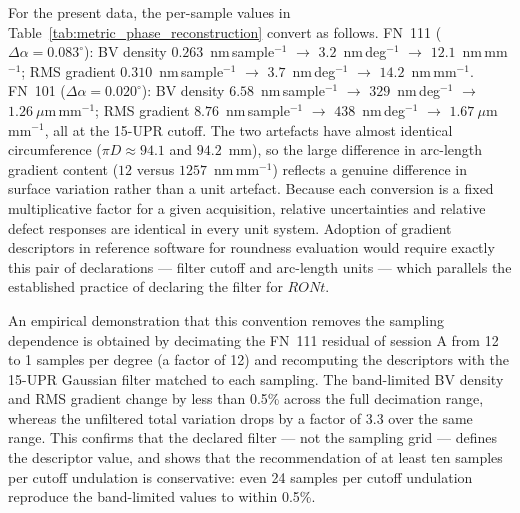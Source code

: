 \documentclass[review]{elsarticle}
\begin{document}
For the present data, the per-sample values in Table~\ref{tab:metric_phase_reconstruction} convert as follows. FN~111 ($\Delta\alpha=0.083^\circ$): BV density $0.263$~nm\,sample$^{-1}$ $\rightarrow$ $3.2$~nm\,deg$^{-1}$ $\rightarrow$ $12.1$~nm\,mm$^{-1}$; RMS gradient $0.310$~nm\,sample$^{-1}$ $\rightarrow$ $3.7$~nm\,deg$^{-1}$ $\rightarrow$ $14.2$~nm\,mm$^{-1}$. FN~101 ($\Delta\alpha=0.020^\circ$): BV density $6.58$~nm\,sample$^{-1}$ $\rightarrow$ $329$~nm\,deg$^{-1}$ $\rightarrow$ $1.26~\mu$m\,mm$^{-1}$; RMS gradient $8.76$~nm\,sample$^{-1}$ $\rightarrow$ $438$~nm\,deg$^{-1}$ $\rightarrow$ $1.67~\mu$m\,mm$^{-1}$, all at the 15-UPR cutoff. The two artefacts have almost identical circumference ($\pi D \approx 94.1$ and $94.2$~mm), so the large difference in arc-length gradient content ($12$ versus $1257$~nm\,mm$^{-1}$) reflects a genuine difference in surface variation rather than a unit artefact. Because each conversion is a fixed multiplicative factor for a given acquisition, relative uncertainties and relative defect responses are identical in every unit system. Adoption of gradient descriptors in reference software for roundness evaluation would require exactly this pair of declarations --- filter cutoff and arc-length units --- which parallels the established practice of declaring the filter for $RONt$.

An empirical demonstration that this convention removes the sampling dependence is obtained by decimating the FN~111 residual of session A from 12 to 1 samples per degree (a factor of 12) and recomputing the descriptors with the 15-UPR Gaussian filter matched to each sampling. The band-limited BV density and RMS gradient change by less than 0.5\% across the full decimation range, whereas the unfiltered total variation drops by a factor of 3.3 over the same range. This confirms that the declared filter --- not the sampling grid --- defines the descriptor value, and shows that the recommendation of at least ten samples per cutoff undulation is conservative: even 24 samples per cutoff undulation reproduce the band-limited values to within 0.5\%.
\end{document}
